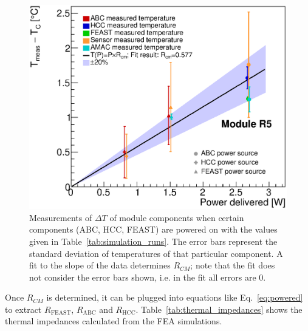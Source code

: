 \begin{figure}[ht!]
\includegraphics[width=0.49\linewidth]{figures/ThermalImpedanceFit_R5_Rcm.eps}
\caption{Measurements of $\Delta T$ of module components when certain components (ABC, HCC, FEAST)
are powered on with the values given in Table~\ref{tab:simulation_runs}. 
The error bars represent the standard deviation of temperatures of that particular
component. A fit to the slope of the data determines $R_{CM}$; note that the fit does not consider
the error bars shown, i.e. in the fit all errors are 0.
}
\label{rcm_fits}
\end{figure}

Once $R_{CM}$ is determined, it can be plugged into equations like Eq.~\ref{eq:powered} to extract
$R_\text{FEAST}$, $R_\text{ABC}$ and $R_\text{HCC}$.
Table~\ref{tab:thermal_impedances} shows the thermal impedances calculated
from the FEA simulations.

\def\insulabc{$(R\times n)_\text{ABC}$\xspace}
\def\insulhcc{$(R\times n)_\text{HCC}$\xspace}
\def\insulfeast{$(R\times n)_\text{FEAST}$\xspace}

